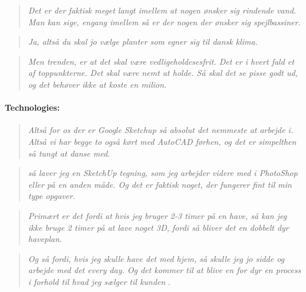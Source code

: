 \begin{quote}
	\textit{Det er der faktisk meget langt imellem at nogen ønsker sig rindende vand. Man kan sige, engang imellem så er der nogen der ønsker sig spejlbassiner.}\label{quote:expertDesign2Danish}\\
\end{quote}

\begin{quote}
	\textit{Ja, altså du skal jo vælge planter som egner sig til dansk klima.}\label{quote:expertDesign3Danish}\\
\end{quote}

\begin{quote}
	\textit{Men trenden, er at det skal være vedligeholdesesfrit. Det er i hvert fald et af toppunkterne. Det skal være nemt at holde. Så skal det se pisse godt ud, og det behøver ikke at koste en milion.}\label{quote:expertDesign4Danish}\\
\end{quote}

\paragraph*{Technologies:}
\begin{quote}
	\textit{Altså for os der er Google Sketchup så absolut det nemmeste at arbejde i. Altså vi har begge to også kørt med AutoCAD førhen, og det er simpelthen så tungt at danse med}\label{quote:expertTech1Danish}.\\
\end{quote}

\begin{quote}
	\textit{så laver jeg en SketchUp tegning, som jeg arbejder videre med i PhotoShop eller på en anden måde. Og det er faktisk noget, der fungerer fint til min type opgaver}\label{quote:expertTech2Danish}.\\
\end{quote}

\begin{quote}
	\textit{Primært er det fordi at hvis jeg bruger 2-3 timer på en have, så kan jeg ikke bruge 2 timer på at lave noget 3D, fordi så bliver det en dobbelt dyr haveplan}\label{quote:expertTech3Danish}.\\
\end{quote}

\begin{quote}
	\textit{Og så fordi, hvis jeg skulle have det med hjem, så skulle jeg jo sidde og arbejde med det every day. Og det kommer til at blive en for dyr en process i forhold til hvad jeg sælger til kunden
	}\label{quote:expertTech4Danish}.\\
\end{quote}

